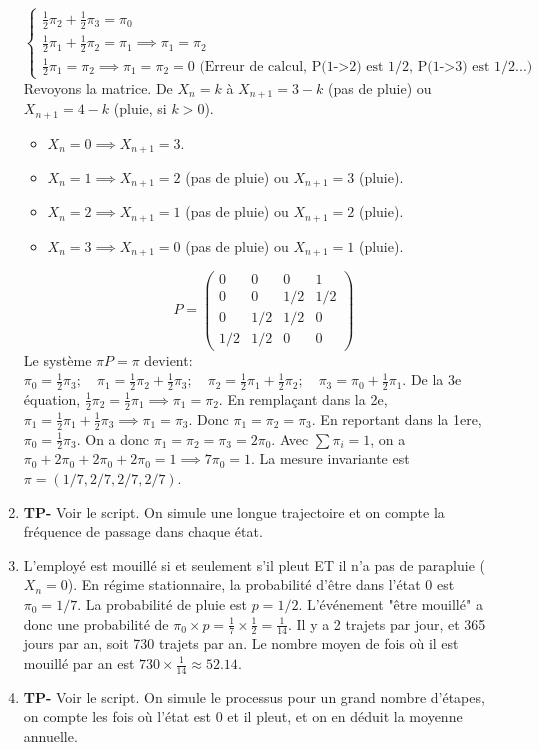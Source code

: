 \documentclass[solutions]{exercices}
\begin{document}
\begin{solution}
\begin{enumerate}
		      \[ \begin{cases}
				      \frac{1}{2}\pi_2 + \frac{1}{2}\pi_3 = \pi_0                      \\
				      \frac{1}{2}\pi_1 + \frac{1}{2}\pi_2 = \pi_1 \implies \pi_1=\pi_2 \\
				      \frac{1}{2}\pi_1 = \pi_2 \implies \pi_1=\pi_2=0 \text{ (Erreur de calcul, P(1->2) est 1/2, P(1->3) est 1/2...)}
			      \end{cases} \]
		      Revoyons la matrice. De $X_n=k$ à $X_{n+1}=3-k$ (pas de pluie) ou $X_{n+1}=4-k$ (pluie, si $k>0$).
		      \begin{itemize}
			      \item $X_n=0 \implies X_{n+1}=3$.
			      \item $X_n=1 \implies X_{n+1}=2$ (pas de pluie) ou $X_{n+1}=3$ (pluie).
			      \item $X_n=2 \implies X_{n+1}=1$ (pas de pluie) ou $X_{n+1}=2$ (pluie).
			      \item $X_n=3 \implies X_{n+1}=0$ (pas de pluie) ou $X_{n+1}=1$ (pluie).
		      \end{itemize}
		      \[ P = \begin{pmatrix}
				      0   & 0   & 0   & 1   \\
				      0   & 0   & 1/2 & 1/2 \\
				      0   & 1/2 & 1/2 & 0   \\
				      1/2 & 1/2 & 0   & 0
			      \end{pmatrix} \]
		      Le système $\pi P=\pi$ devient:
		      $ \pi_0 = \frac{1}{2}\pi_3; \quad \pi_1 = \frac{1}{2}\pi_2 + \frac{1}{2}\pi_3; \quad \pi_2 = \frac{1}{2}\pi_1 + \frac{1}{2}\pi_2; \quad \pi_3 = \pi_0 + \frac{1}{2}\pi_1$.
		      De la 3e équation, $\frac{1}{2}\pi_2 = \frac{1}{2}\pi_1 \implies \pi_1=\pi_2$.
		      En remplaçant dans la 2e, $\pi_1 = \frac{1}{2}\pi_1 + \frac{1}{2}\pi_3 \implies \pi_1=\pi_3$.
		      Donc $\pi_1=\pi_2=\pi_3$. En reportant dans la 1ere, $\pi_0 = \frac{1}{2}\pi_3$.
		      On a donc $\pi_1=\pi_2=\pi_3=2\pi_0$.
		      Avec $\sum \pi_i = 1$, on a $\pi_0 + 2\pi_0 + 2\pi_0 + 2\pi_0 = 1 \implies 7\pi_0 = 1$.
		      La mesure invariante est $\pi = (1/7, 2/7, 2/7, 2/7)$.
		\item \textbf{TP-} Voir le script. On simule une longue trajectoire et on compte la fréquence de passage dans chaque état.
		\item L'employé est mouillé si et seulement s'il pleut ET il n'a pas de parapluie ($X_n=0$). En régime stationnaire, la probabilité d'être dans l'état 0 est $\pi_0 = 1/7$. La probabilité de pluie est $p=1/2$. L'événement "être mouillé" a donc une probabilité de $\pi_0 \times p = \frac{1}{7} \times \frac{1}{2} = \frac{1}{14}$.
		      Il y a 2 trajets par jour, et 365 jours par an, soit 730 trajets par an.
		      Le nombre moyen de fois où il est mouillé par an est $730 \times \frac{1}{14} \approx 52.14$.
		\item \textbf{TP-} Voir le script. On simule le processus pour un grand nombre d'étapes, on compte les fois où l'état est 0 et il pleut, et on en déduit la moyenne annuelle.
	\end{enumerate}
\end{solution}
\end{document}
